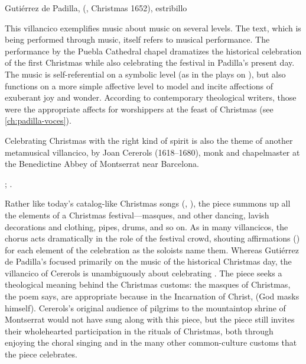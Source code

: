 {Gutiérrez de Padilla, 
(, Christmas 1652), estribillo}

This villancico exemplifies music about music on several levels.
The text, which is being performed through music, itself refers to musical
performance.
The performance by the Puebla Cathedral chapel dramatizes the historical
celebration of the first Christmas while also celebrating the festival in
Padilla's present day.  
The music is self-referential on a symbolic level (as in the plays on
), but also functions on a more simple affective level to model and
incite affections of exuberant joy and wonder.
According to contemporary theological writers, those were the appropriate
affects for worshippers at the feast of Christmas (see
\cref{ch:padilla-voces}).

Celebrating Christmas with the right kind of spirit is also the theme of
another metamusical villancico,  by Joan
Cererols (1618--1680), monk and chapelmaster at the Benedictine Abbey of
Montserrat near Barcelona.%
\begin{Footnote}
    ; \autocite[81--94]{Cererols:MEM-VC}.
\end{Footnote}
Rather like today's catalog-like Christmas songs (,
), the piece summons up all the
elements of a Christmas festival---masques,  and other
dancing, lavish decorations and clothing, pipes, drums, and so on.
As in many villancicos, the chorus acts dramatically in the role of the
festival crowd, shouting affirmations () for each element of
the celebration as the soloists name them.  
Whereas Gutiérrez de Padilla's  focused
primarily on the music of the historical Christmas day, the villancico of
Cererols is unambiguously about celebrating .
The piece seeks a theological meaning behind the Christmas customs: the masques
of Christmas, the poem says, are appropriate because in the Incarnation of
Christ,  (God masks himself).
Cererols's original audience of pilgrims to the mountaintop shrine of
Montserrat would not have sung along with this piece, but the piece still
invites their wholehearted participation in the rituals of Christmas, both
through enjoying the choral singing and in the many other common-culture
customs that the piece celebrates.

